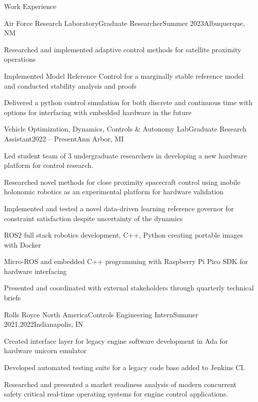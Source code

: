 \documentclass[]{jheidegger-resume}
\begin{document}
\begin{section}{Work Experience}
    \begin{subsection}{Air Force Research Laboratory}{Graduate Researcher}{Summer 2023}{Albuquerque, NM}
        \item Researched and implemented adaptive control methods for satellite proximity operations
        \item Implemented Model Reference Control for a marginally stable reference model and conducted stability analysis and proofs
        \item Delivered a python control simulation for both discrete and continuous time with options for interfacing with embedded hardware in the future
    \end{subsection}
    \begin{subsection}{Vehicle Optimization, Dynamics, Controls \& Autonomy Lab}{Graduate Research Assistant}{2022 -- Present}{Ann Arbor, MI}
        \item Led student team of 3 undergraduate researchers in developing a new hardware platform for control research.
        \item Researched novel methods for close proximity spacecraft control using mobile holonomic robotics as an experimental platform for hardware validation
        \item Implemented and tested a novel data-driven learning reference governor for constraint satisfaction despite uncertainty of the dynamics
        \item ROS2 full stack robotics development, C++, Python creating portable images with Docker
        \item Micro-ROS and embedded C++ programming with Raspberry Pi Pico SDK for hardware interfacing
        \item Presented and coordinated with external stakeholders through quarterly technical briefs
    \end{subsection}
    
    \begin{subsection}{Rolls Royce North America}{Controls Engineering Intern}{Summer 2021,2022}{Indianapolis, IN}
        \item Created interface layer for legacy engine software development in Ada for hardware unicorn emulator
        \item Developed automated testing suite for a legacy code base added to  Jenkins CI.
        \item Researched and presented a market readiness analysis of modern concurrent safety critical real-time operating systems for engine control applications. 
    \end{subsection}
    
\end{section}
\end{document}

